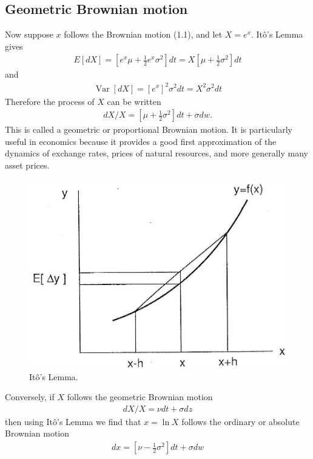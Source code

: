 \documentclass[12pt]{article}
\theoremstyle{definition}
\begin{document}
\subsection{Geometric Brownian motion}
Now suppose $x$ follows the Brownian motion (1.1), and let $X=e^{x}$. Itô’s Lemma gives
\begin{align*}
E[d X]=\left[e^{x} \mu+\frac{1}{2} e^{x} \sigma^{2}\right] d t=X\left[\mu+\frac{1}{2} \sigma^{2}\right] d t
\end{align*}
and
\begin{align*}
\operatorname{Var}[d X]=\left[e^{x}\right]^{2} \sigma^{2} d t=X^{2} \sigma^{2} d t
\end{align*}
Therefore the process of $X$ can be written
\begin{align*}
d X / X=\left[\mu+\frac{1}{2} \sigma^{2}\right] d t+\sigma d w .
\end{align*}
This is called a geometric or proportional Brownian motion. It is particularly useful in economics because it provides a good first approximation of the dynamics of exchange rates, prices of natural resources, and more generally many asset prices.
\begin{figure}
    \centering
    \includegraphics[max width=\textwidth]{2024_03_12_f639bb6397b3ab65b08bg-04}
    \caption{Itô's Lemma.}\label{fig: 1.2}
\end{figure}
Conversely, if $X$ follows the geometric Brownian motion
\begin{align}
d X / X=\nu d t+\sigma d z \label{1.8}
\end{align}
then using Itô's Lemma we find that $x=\ln X$ follows the ordinary or absolute Brownian motion
\begin{align*}
d x=\left[\nu-\frac{1}{2} \sigma^{2}\right] d t+\sigma dw
\end{align*}
\end{document}
